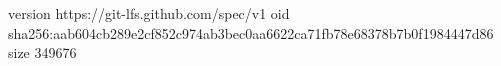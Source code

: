 version https://git-lfs.github.com/spec/v1
oid sha256:aab604cb289e2cf852c974ab3bec0aa6622ca71fb78e68378b7b0f1984447d86
size 349676

